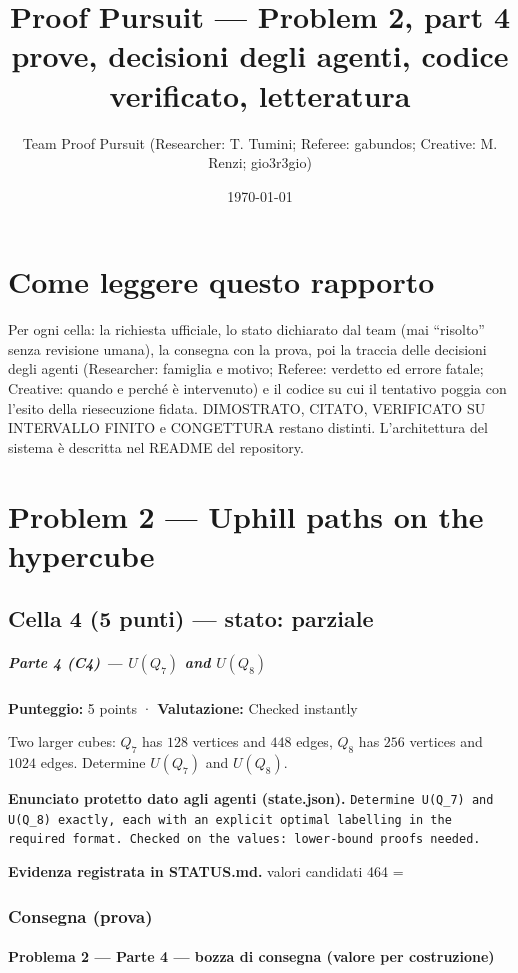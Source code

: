 \documentclass[11pt,a4paper]{article}
\title{Proof Pursuit --- Problem 2, part 4\\ \large prove, decisioni degli agenti, codice verificato, letteratura}
\author{Team Proof Pursuit (Researcher: T. Tumini; Referee: gabundos; Creative: M. Renzi; gio3r3gio)}
\date{\today}
\begin{document}
\maketitle\tableofcontents
\section*{Come leggere questo rapporto}
Per ogni cella: la richiesta ufficiale, lo stato dichiarato dal team (mai ``risolto'' senza revisione umana), la consegna
con la prova, poi la traccia delle decisioni degli agenti (Researcher: famiglia e motivo; Referee: verdetto ed errore
fatale; Creative: quando e perché è intervenuto) e il codice su cui il tentativo poggia con l'esito della riesecuzione
fidata. DIMOSTRATO, CITATO, VERIFICATO SU INTERVALLO FINITO e CONGETTURA restano distinti. L'architettura del sistema
è descritta nel README del repository.
\section{Problem 2 — Uphill paths on the hypercube}
\subsection{Cella 4 (5 punti) — stato: parziale}
\subparagraph{\texorpdfstring{Parte 4 (C4) --- \(U(Q_7)\) and
\(U(Q_8)\)}{Parte 4 (C4) --- U(Q\_7) and U(Q\_8)}}\label{parte-4-c4-uq_7-and-uq_8}

\textbf{Punteggio:} 5 points · \textbf{Valutazione:} Checked instantly

Two larger cubes: \(Q_7\) has \(128\) vertices and \(448\) edges,
\(Q_8\) has \(256\) vertices and \(1024\) edges. Determine \(U(Q_7)\)
and \(U(Q_8)\).

\textbf{Enunciato protetto dato agli agenti (state.json).} \texttt{Determine U(Q\_7) and U(Q\_8) exactly, each with an explicit optimal labelling in the required format. Checked on the values: lower-bound proofs needed.}

\textbf{Evidenza registrata in STATUS.md.} valori candidati 464 =

\subsubsection{Consegna (prova)}
\paragraph{Problema 2 --- Parte 4 --- bozza di consegna (valore per
costruzione)}\label{problema-2-parte-4-bozza-di-consegna-valore-per-costruzione}
\end{document}
